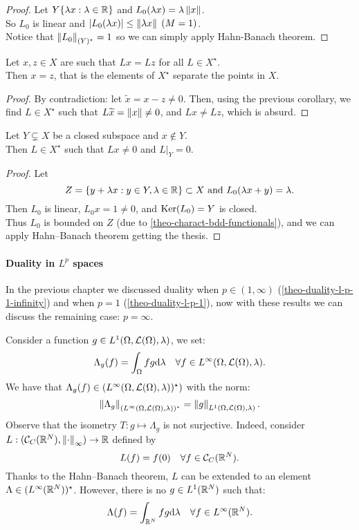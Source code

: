 \begin{proof}
	Let $Y  \{\lambda x : \lambda \in \mathbb R \}$ and $L_0(\lambda x) = \lambda \left\lVert x\right\rVert$. \\
	So $L_0$ is linear and $|L_0(\lambda x)| \leq \left\lVert\lambda x\right\rVert \; (M=1)$.\\	
	Notice that $\left\lVert L_0\right\rVert_{(Y)^\star}= 1$ so we can simply apply Hahn-Banach theorem.
\end{proof}

\begin{coro} \label{prop-conseq-HB-2}
	Let $x,z \in X$ are such that $Lx=Lz$ for all $L \in X^\star$.\\
	Then $x=z$, that is the elements of $X^\star$ separate the points in $X$.
\end{coro}

\begin{proof}
	By contradiction: let $\tilde x = x-z \neq 0$. Then, using the previous corollary, we find $L\in X^\star$ such that $L\widetilde x = \left\lVert x\right\rVert \neq 0$, and $Lx \neq Lz$, which is absurd.
\end{proof}

\begin{coro} \label{prop-conseq-HB-3}
	Let $Y \subsetneq X$ be a closed subspace and $x\notin Y$. \\
	Then $L \in X^\star$ such that $Lx \neq 0$ and $L|_Y =0$.
\end{coro}

\begin{proof}
	Let
	$$Z = \{y+\lambda x : y \in Y, \lambda \in \mathbb R\} \subset X \text{ and } L_0(\lambda x  + y) = \lambda.$$
	Then $L_0$ is linear, $L_0 x = 1 \neq 0$, and $\operatorname{Ker}(L_0)= Y$ is closed.\\
	Thus $L_0$ is bounded on $Z$ (due to \vref{theo-charact-bdd-functionals}), and we can apply Hahn--Banach theorem getting the thesis.
\end{proof}

\paragraph{Duality in $L^p$ spaces}\label{paragraph-duality-p-infinity} In the previous chapter we discussed duality when $p\in(1,\infty)$ (\vref{theo-duality-l-p-1-infinity}) and when $p=1$ (\vref{theo-duality-l-p-1}), now with these results we can discuss the remaining case: $p=\infty$.

Consider a function $g\in L^1(\Omega, \mathcal L(\Omega), \lambda)$, we set:
$$\Lambda_g(f) = \int_\Omega f g \mathrm d \lambda \quad \forall f \in L^\infty(\Omega, \mathcal L(\Omega), \lambda).$$
We have that $\Lambda_g(f) \in (L^\infty(\Omega, \mathcal L(\Omega), \lambda))^\star)$ with the norm:
$$\left\lVert\Lambda_g\right\rVert_{(L^\infty(\Omega, \mathcal L(\Omega), \lambda))^\star} = \left\lVert g\right\rVert_{L^1(\Omega, \mathcal L(\Omega), \lambda)}.$$
Observe that the isometry $T: g \mapsto  \Lambda_g$ is not surjective. Indeed, consider $L:(\mathcal C_C(\mathbb R^N), \left\lVert\cdot\right\rVert_\infty) \to \mathbb R$ defined by
$$L(f) = f(0) \quad \forall f \in \mathcal C_C(\mathbb R^N).$$
Thanks to the Hahn--Banach theorem, $L$ can be extended to an element $\Lambda \in (L^\infty(\mathbb R^N))^\star$.
However, there is no $g \in L^1(\mathbb R^N)$ such that: $$\Lambda(f) = \int_{\mathbb R^N}fg \mathrm d \lambda \quad \forall f \in L^\infty(\mathbb R^N).$$

